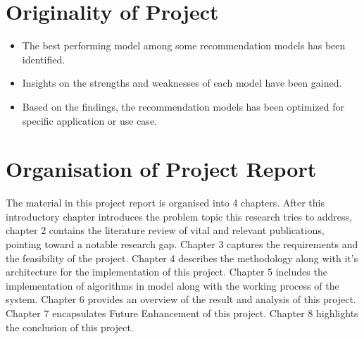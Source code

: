 \section{Originality of Project}

\begin{itemize}
    \item The best performing model among some recommendation models has been identified.
    \item Insights on the strengths and weaknesses of each model have been gained.
    \item Based on the findings, the recommendation models has been optimized for specific application or use case.
\end{itemize}

\section{Organisation of Project Report}

The material in this project report is organised into 4 chapters. After this introductory chapter introduces the problem topic this research tries to address, chapter 2 contains the literature review of vital and relevant publications, pointing toward a notable research gap. Chapter 3 captures the requirements and the feasibility of the project. Chapter 4 describes the methodology along with it's architecture for the implementation of this project. Chapter 5 includes the implementation of algorithms in model along with the working process of the system. Chapter 6 provides an overview of the result and analysis of this project. Chapter 7 encapsulates Future Enhancement of this project. Chapter 8 highlights the conclusion of this project.  